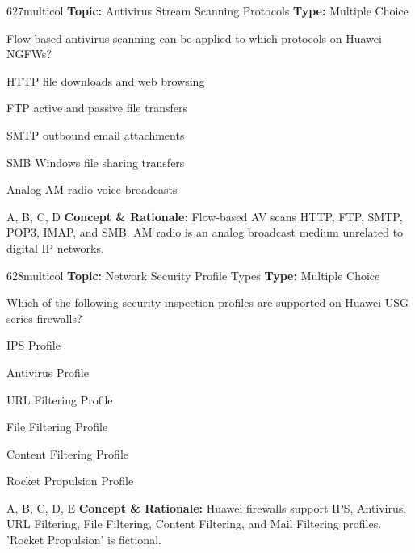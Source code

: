 \begin{qcard}{627}{multicol}
\textcolor{darkslate!75}{\small\textbf{Topic:} Antivirus Stream Scanning Protocols \hfill \textbf{Type:} Multiple Choice}\vspace{0.4em}\par
Flow-based antivirus scanning can be applied to which protocols on Huawei NGFWs?
\begin{qoptions}
\item HTTP file downloads and web browsing
\item FTP active and passive file transfers
\item SMTP outbound email attachments
\item SMB Windows file sharing transfers
\item Analog AM radio voice broadcasts
\end{qoptions}
\end{qcard}
\nopagebreak
\begin{explainbox}{A, B, C, D}
\textbf{Concept \& Rationale:} Flow-based AV scans HTTP, FTP, SMTP, POP3, IMAP, and SMB. AM radio is an analog broadcast medium unrelated to digital IP networks.
\end{explainbox}

\begin{qcard}{628}{multicol}
\textcolor{darkslate!75}{\small\textbf{Topic:} Network Security Profile Types \hfill \textbf{Type:} Multiple Choice}\vspace{0.4em}\par
Which of the following security inspection profiles are supported on Huawei USG series firewalls?
\begin{qoptions}
\item IPS Profile
\item Antivirus Profile
\item URL Filtering Profile
\item File Filtering Profile
\item Content Filtering Profile
\item Rocket Propulsion Profile
\end{qoptions}
\end{qcard}
\nopagebreak
\begin{explainbox}{A, B, C, D, E}
\textbf{Concept \& Rationale:} Huawei firewalls support IPS, Antivirus, URL Filtering, File Filtering, Content Filtering, and Mail Filtering profiles. 'Rocket Propulsion' is fictional.
\end{explainbox}

